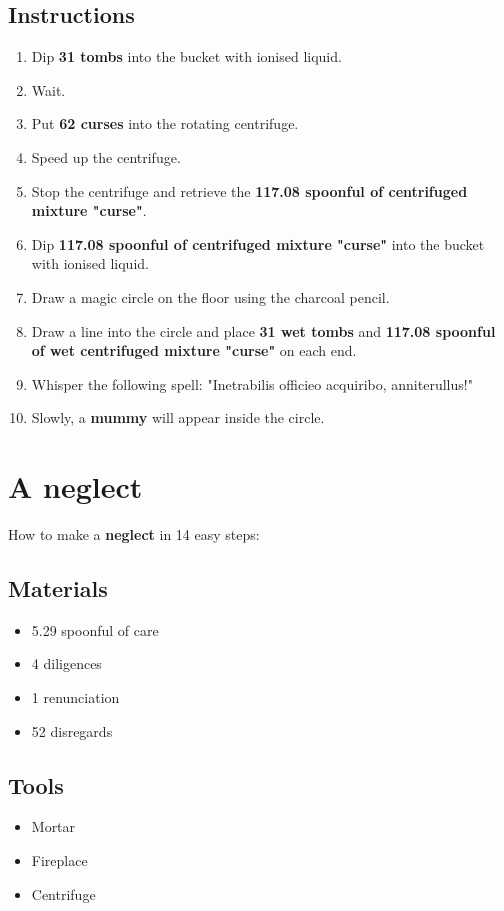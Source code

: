 \documentclass{article}
\begin{document}
\subsection{Instructions}\begin{enumerate}
\item 
Dip \textbf{31 tombs} into the bucket with ionised liquid.
\item 
Wait.
\item 
Put \textbf{62 curses} into the rotating centrifuge.
\item 
Speed up the centrifuge.
\item 
Stop the centrifuge and retrieve the \textbf{117.08 spoonful of centrifuged mixture "curse"}.
\item 
Dip \textbf{117.08 spoonful of centrifuged mixture "curse"} into the bucket with ionised liquid.
\item 
Draw a magic circle on the floor using the charcoal pencil.
\item 
Draw a line into the circle and place \textbf{31 wet tombs} and \textbf{117.08 spoonful of wet centrifuged mixture "curse"} on each end.
\item 
Whisper the following spell: "Inetrabilis officieo acquiribo, anniterullus!"
\item 
Slowly, a \textbf{mummy} will appear inside the circle.
\end{enumerate}
\newpage
\section{A neglect}How to make a \textbf{neglect} in 14 easy steps:

\subsection{Materials}\begin{itemize}
\item 
5.29 spoonful of care
\item 
4 diligences
\item 
1 renunciation
\item 
52 disregards
\end{itemize}
\subsection{Tools}\begin{itemize}
\item 
Mortar
\item 
Fireplace
\item 
Centrifuge
\end{itemize}
\end{document}
